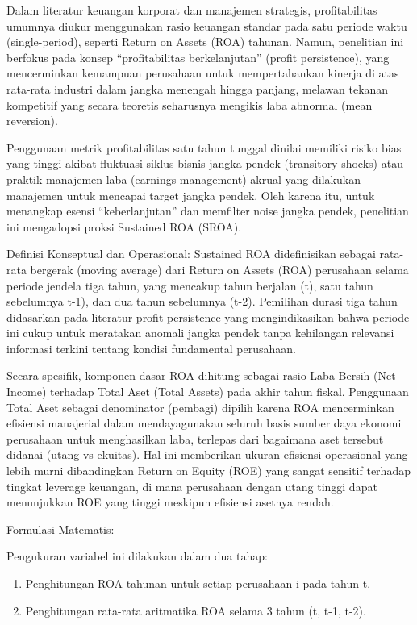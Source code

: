 \documentclass[12pt,a4paper]{report}
\providecommand{\tightlist}{%
  \setlength{\itemsep}{0pt}\setlength{\parskip}{0pt}%
}
\begin{document}
Dalam literatur keuangan korporat dan manajemen strategis,
profitabilitas umumnya diukur menggunakan rasio keuangan standar pada
satu periode waktu (single-period), seperti Return on Assets (ROA)
tahunan. Namun, penelitian ini berfokus pada konsep ``profitabilitas
berkelanjutan'' (profit persistence), yang mencerminkan kemampuan
perusahaan untuk mempertahankan kinerja di atas rata-rata industri dalam
jangka menengah hingga panjang, melawan tekanan kompetitif yang secara
teoretis seharusnya mengikis laba abnormal (mean reversion).

Penggunaan metrik profitabilitas satu tahun tunggal dinilai memiliki
risiko bias yang tinggi akibat fluktuasi siklus bisnis jangka pendek
(transitory shocks) atau praktik manajemen laba (earnings management)
akrual yang dilakukan manajemen untuk mencapai target jangka pendek.
Oleh karena itu, untuk menangkap esensi ``keberlanjutan'' dan memfilter
noise jangka pendek, penelitian ini mengadopsi proksi Sustained ROA
(SROA).

Definisi Konseptual dan Operasional: Sustained ROA didefinisikan sebagai
rata-rata bergerak (moving average) dari Return on Assets (ROA)
perusahaan selama periode jendela tiga tahun, yang mencakup tahun
berjalan (t), satu tahun sebelumnya t-1), dan dua tahun sebelumnya
(t-2). Pemilihan durasi tiga tahun didasarkan pada literatur profit
persistence yang mengindikasikan bahwa periode ini cukup untuk meratakan
anomali jangka pendek tanpa kehilangan relevansi informasi terkini
tentang kondisi fundamental perusahaan.

Secara spesifik, komponen dasar ROA dihitung sebagai rasio Laba Bersih
(Net Income) terhadap Total Aset (Total Assets) pada akhir tahun fiskal.
Penggunaan Total Aset sebagai denominator (pembagi) dipilih karena ROA
mencerminkan efisiensi manajerial dalam mendayagunakan seluruh basis
sumber daya ekonomi perusahaan untuk menghasilkan laba, terlepas dari
bagaimana aset tersebut didanai (utang vs ekuitas). Hal ini memberikan
ukuran efisiensi operasional yang lebih murni dibandingkan Return on
Equity (ROE) yang sangat sensitif terhadap tingkat leverage keuangan, di
mana perusahaan dengan utang tinggi dapat menunjukkan ROE yang tinggi
meskipun efisiensi asetnya rendah.

Formulasi Matematis:

Pengukuran variabel ini dilakukan dalam dua tahap:

\begin{enumerate}
\def\labelenumi{\arabic{enumi}.}
\tightlist
\item
  Penghitungan ROA tahunan untuk setiap perusahaan i pada tahun t.
\item
  Penghitungan rata-rata aritmatika ROA selama 3 tahun (t, t-1, t-2).
\end{enumerate}
\end{document}
